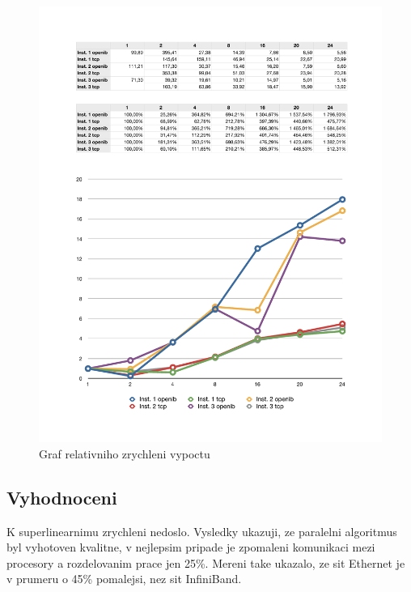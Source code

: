 \documentclass[a4paper]{article}
\begin{document}
\begin{figure}[ht]
\centerline{\includegraphics[width=\textwidth]{graph.pdf}}
\caption{Graf relativniho zrychleni vypoctu}
\label{graph}
\end{figure}

\subsection{Vyhodnoceni}
K superlinearnimu zrychleni nedoslo. Vysledky ukazuji, ze paralelni algoritmus byl vyhotoven
kvalitne, v nejlepsim pripade je zpomaleni komunikaci mezi procesory a rozdelovanim prace
jen 25\%. Mereni take ukazalo, ze sit Ethernet je v prumeru o 45\% pomalejsi, nez
sit InfiniBand.
\end{document}
